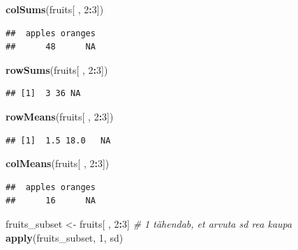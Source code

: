 \documentclass[]{book}
\newenvironment{Shaded}{\begin{snugshade}}{\end{snugshade}}
\newcommand{\KeywordTok}[1]{\textcolor[rgb]{0.13,0.29,0.53}{\textbf{#1}}}
\newcommand{\DecValTok}[1]{\textcolor[rgb]{0.00,0.00,0.81}{#1}}
\newcommand{\StringTok}[1]{\textcolor[rgb]{0.31,0.60,0.02}{#1}}
\newcommand{\CommentTok}[1]{\textcolor[rgb]{0.56,0.35,0.01}{\textit{#1}}}
\newcommand{\OperatorTok}[1]{\textcolor[rgb]{0.81,0.36,0.00}{\textbf{#1}}}
\newcommand{\NormalTok}[1]{#1}
\begin{document}
\begin{Shaded}
\begin{Highlighting}[]
\KeywordTok{colSums}\NormalTok{(fruits[ , }\DecValTok{2}\OperatorTok{:}\DecValTok{3}\NormalTok{])}
\end{Highlighting}
\end{Shaded}

\begin{verbatim}
##  apples oranges 
##      48      NA
\end{verbatim}

\begin{Shaded}
\begin{Highlighting}[]
\KeywordTok{rowSums}\NormalTok{(fruits[ , }\DecValTok{2}\OperatorTok{:}\DecValTok{3}\NormalTok{])}
\end{Highlighting}
\end{Shaded}

\begin{verbatim}
## [1]  3 36 NA
\end{verbatim}

\begin{Shaded}
\begin{Highlighting}[]
\KeywordTok{rowMeans}\NormalTok{(fruits[ , }\DecValTok{2}\OperatorTok{:}\DecValTok{3}\NormalTok{])}
\end{Highlighting}
\end{Shaded}

\begin{verbatim}
## [1]  1.5 18.0   NA
\end{verbatim}

\begin{Shaded}
\begin{Highlighting}[]
\KeywordTok{colMeans}\NormalTok{(fruits[ , }\DecValTok{2}\OperatorTok{:}\DecValTok{3}\NormalTok{])}
\end{Highlighting}
\end{Shaded}

\begin{verbatim}
##  apples oranges 
##      16      NA
\end{verbatim}

\begin{Shaded}
\begin{Highlighting}[]
\NormalTok{fruits_subset <-}\StringTok{ }\NormalTok{fruits[ , }\DecValTok{2}\OperatorTok{:}\DecValTok{3}\NormalTok{]}
\CommentTok{# 1 tähendab, et arvuta sd rea kaupa}
\KeywordTok{apply}\NormalTok{(fruits_subset, }\DecValTok{1}\NormalTok{, sd)}
\end{Highlighting}
\end{Shaded}
\end{document}

